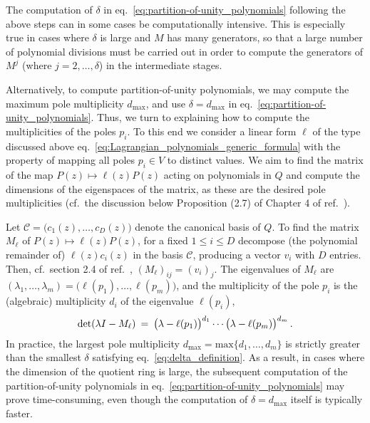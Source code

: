 \documentclass[dvipsnames,preprint,12pt,sort&compress]{elsarticle}
\begin{document}
The computation of $\delta$ in eq.~\eqref{eq:partition-of-unity_polynomials}
following the above steps can in some cases be computationally intensive. This is especially
true in cases where $\delta$ is large and $M$ has many generators,
so that a large number of polynomial divisions must be carried out
in order to compute the generators of $M^j$ (where $j = 2, \ldots, \delta$)
in the intermediate stages.

Alternatively, to compute partition-of-unity polynomials,
we may compute the maximum pole multiplicity $d_\mathrm{max}$,
and use $\delta = d_\mathrm{max}$ in eq.~\eqref{eq:partition-of-unity_polynomials}.
Thus, we turn to explaining how to compute the multiplicities of the
poles $p_i$. To this end we consider a linear form $\ell$ of the type discussed above
eq.~\eqref{eq:Lagrangian_polynomials_generic_formula} with the
property of mapping all poles $p_i \in V$ to distinct values. We aim to find
the matrix of the map $P(z) \mapsto \ell(z) P(z)$ acting on polynomials in $Q$
and compute the dimensions of the eigenspaces of the matrix, as these are
the desired pole multiplicities (cf.~the discussion below Proposition (2.7) of
Chapter 4 of ref.~\cite{UsingAlgebraicGeometry}).

Let $\mathcal{C} = \big( c_1 (z), \ldots, c_D (z) \big)$ denote
the canonical basis of $Q$. To find the matrix $M_\ell$ of $P(z) \mapsto \ell(z) P(z)$,
for a fixed $1 \leq i \leq D$ decompose (the polynomial remainder of)
$\ell(z) c_i (z)$ in the basis $\mathcal{C}$,
producing a vector $v_i$ with $D$ entries. Then, cf.~section 2.4
of ref.~\cite{UsingAlgebraicGeometry}, $(M_\ell)_{ij} = (v_i)_j$.
The eigenvalues of $M_\ell$ are $(\lambda_1, \ldots, \lambda_m)
= \big( \ell(p_1), \ldots, \ell(p_m) \big)$, and the multiplicity of the
pole $p_i$ is the (algebraic) multiplicity $d_i$ of the eigenvalue $\ell(p_i)$,
\begin{equation}
\det (\lambda I - M_\ell) \hspace{0.8mm}=\hspace{0.8mm}
\big(\lambda - \ell(p_1)\big)^{d_1} \cdots \big(\lambda - \ell(p_m)\big)^{d_m} \,.
\end{equation}
In practice, the largest pole multiplicity $d_\mathrm{max} =
\mathrm{max} \{d_1, \ldots, d_m\}$ is strictly greater than
the smallest $\delta$ satisfying eq.~\eqref{eq:delta_definition}. As a result,
in cases where the dimension of the quotient ring is large, the
subsequent computation of the partition-of-unity polynomials
in eq.~\eqref{eq:partition-of-unity_polynomials} may prove time-consuming, even though the
computation of $\delta = d_\mathrm{max}$ itself is typically faster.
\end{document}
